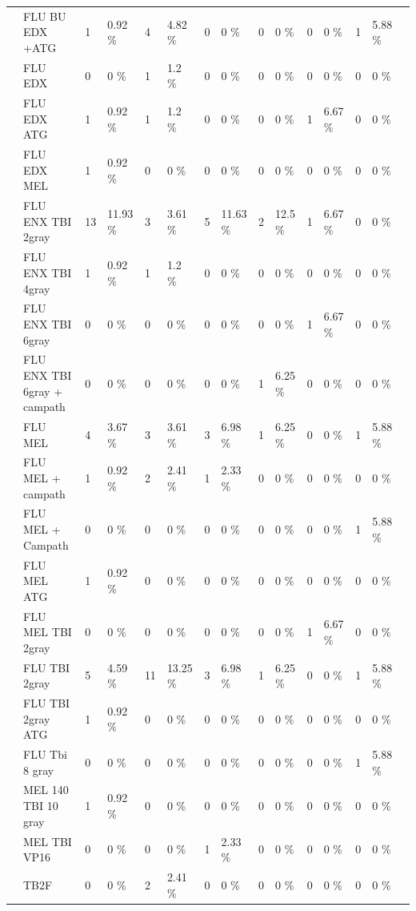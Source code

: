 \documentclass[a4paper,11pt] {article}
\begin{document}
\begin{landscape}
\begin{longtable}{lllllllllllllll}
   & FLU BU EDX +ATG & 1 & 0.92 \% & 4 & 4.82 \% & 0 & 0 \% & 0 & 0 \% & 0 & 0 \% & 1 & 5.88 \% &  \\ 
   & FLU EDX & 0 & 0 \% & 1 & 1.2 \% & 0 & 0 \% & 0 & 0 \% & 0 & 0 \% & 0 & 0 \% &  \\ 
   & FLU EDX ATG & 1 & 0.92 \% & 1 & 1.2 \% & 0 & 0 \% & 0 & 0 \% & 1 & 6.67 \% & 0 & 0 \% &  \\ 
   & FLU EDX MEL & 1 & 0.92 \% & 0 & 0 \% & 0 & 0 \% & 0 & 0 \% & 0 & 0 \% & 0 & 0 \% &  \\ 
   & FLU ENX TBI 2gray & 13 & 11.93 \% & 3 & 3.61 \% & 5 & 11.63 \% & 2 & 12.5 \% & 1 & 6.67 \% & 0 & 0 \% &  \\ 
   & FLU ENX TBI 4gray & 1 & 0.92 \% & 1 & 1.2 \% & 0 & 0 \% & 0 & 0 \% & 0 & 0 \% & 0 & 0 \% &  \\ 
   & FLU ENX TBI 6gray & 0 & 0 \% & 0 & 0 \% & 0 & 0 \% & 0 & 0 \% & 1 & 6.67 \% & 0 & 0 \% &  \\ 
   & FLU ENX TBI 6gray + campath & 0 & 0 \% & 0 & 0 \% & 0 & 0 \% & 1 & 6.25 \% & 0 & 0 \% & 0 & 0 \% &  \\ 
   & FLU MEL & 4 & 3.67 \% & 3 & 3.61 \% & 3 & 6.98 \% & 1 & 6.25 \% & 0 & 0 \% & 1 & 5.88 \% &  \\ 
   & FLU MEL + campath & 1 & 0.92 \% & 2 & 2.41 \% & 1 & 2.33 \% & 0 & 0 \% & 0 & 0 \% & 0 & 0 \% &  \\ 
   & FLU MEL + Campath & 0 & 0 \% & 0 & 0 \% & 0 & 0 \% & 0 & 0 \% & 0 & 0 \% & 1 & 5.88 \% &  \\ 
   & FLU MEL ATG & 1 & 0.92 \% & 0 & 0 \% & 0 & 0 \% & 0 & 0 \% & 0 & 0 \% & 0 & 0 \% &  \\ 
   & FLU MEL TBI 2gray & 0 & 0 \% & 0 & 0 \% & 0 & 0 \% & 0 & 0 \% & 1 & 6.67 \% & 0 & 0 \% &  \\ 
   & FLU TBI 2gray & 5 & 4.59 \% & 11 & 13.25 \% & 3 & 6.98 \% & 1 & 6.25 \% & 0 & 0 \% & 1 & 5.88 \% &  \\ 
   & FLU TBI 2gray ATG & 1 & 0.92 \% & 0 & 0 \% & 0 & 0 \% & 0 & 0 \% & 0 & 0 \% & 0 & 0 \% &  \\ 
   & FLU Tbi 8 gray & 0 & 0 \% & 0 & 0 \% & 0 & 0 \% & 0 & 0 \% & 0 & 0 \% & 1 & 5.88 \% &  \\ 
   & MEL 140 TBI 10 gray & 1 & 0.92 \% & 0 & 0 \% & 0 & 0 \% & 0 & 0 \% & 0 & 0 \% & 0 & 0 \% &  \\ 
   & MEL TBI VP16 & 0 & 0 \% & 0 & 0 \% & 1 & 2.33 \% & 0 & 0 \% & 0 & 0 \% & 0 & 0 \% &  \\ 
   & TB2F & 0 & 0 \% & 2 & 2.41 \% & 0 & 0 \% & 0 & 0 \% & 0 & 0 \% & 0 & 0 \% &  \\ 

\end{longtable}
\end{landscape}
\end{document}
